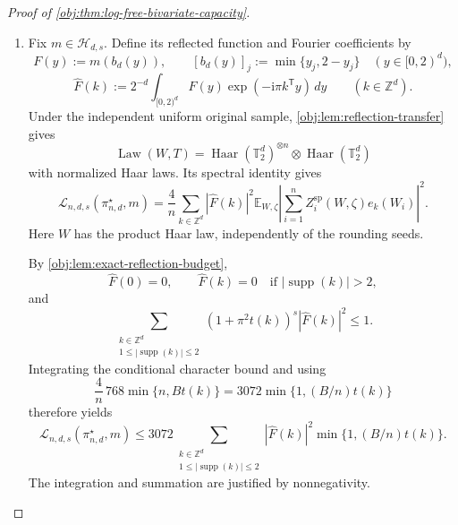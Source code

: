 \documentclass[11pt]{article}
\begin{document}
\begin{proof}[Proof of \cref{obj:thm:log-free-bivariate-capacity}]
\begin{enumerate}
Every support-one or support-two frequency is a listed representative or its negative: its first nonzero coordinate determines the orientation, and there are finitely many representatives below each fixed complexity. Since real signs give
\[
\sum_i Z_i^{\mathrm{sp}}(w,\zeta)e_{-k}(w_i)
=
\overline{\sum_i Z_i^{\mathrm{sp}}(w,\zeta)e_k(w_i)},
\qquad
t(-k)=t(k),
\]
we obtain, for every supported frequency and every deterministic \(w\),
\[
\mathbb E_\zeta
\left|
\sum_{i=1}^n Z_i^{\mathrm{sp}}(w,\zeta)e_k(w_i)
\right|^2
\leq768\min\{n,Bt(k)\},
\qquad
1\leq|\operatorname{supp}(k)|\leq2.
\]

\item
Fix \(m\in\mathcal H_{d,s}\). Define its reflected function and Fourier coefficients by
\[
F(y):=m(b_d(y)),
\qquad
[b_d(y)]_j:=\min\{y_j,2-y_j\}
\quad(y\in[0,2)^d),
\]
\[
\widehat F(k)
:=
2^{-d}\int_{[0,2)^d}
F(y)\exp(-\mathrm i\pi k^{\mathsf T}y)\,dy
\qquad(k\in\mathbb Z^d).
\]
Under the independent uniform original sample, \cref{obj:lem:reflection-transfer} gives
\[
\operatorname{Law}(W,T)
=
\operatorname{Haar}(\mathbb T_2^d)^{\otimes n}
\otimes\operatorname{Haar}(\mathbb T_2^d)
\]
with normalized Haar laws. Its spectral identity gives
\[
\mathcal L_{n,d,s}(\pi^\star_{n,d},m)
=
\frac4n
\sum_{k\in\mathbb Z^d}
|\widehat F(k)|^2
\mathbb E_{W,\zeta}
\left|
\sum_{i=1}^n Z_i^{\mathrm{sp}}(W,\zeta)e_k(W_i)
\right|^2.
\]
Here \(W\) has the product Haar law, independently of the rounding seeds.

By \cref{obj:lem:exact-reflection-budget},
\[
\widehat F(0)=0,
\qquad
\widehat F(k)=0
\quad\text{if }|\operatorname{supp}(k)|>2,
\]
and
\[
\sum_{\substack{k\in\mathbb Z^d\\
1\leq|\operatorname{supp}(k)|\leq2}}
(1+\pi^2t(k))^s|\widehat F(k)|^2
\leq1.
\]
Integrating the conditional character bound and using
\[
\frac4n\,768\min\{n,Bt(k)\}
=
3072\min\{1,(B/n)t(k)\}
\]
therefore yields
\[
\mathcal L_{n,d,s}(\pi^\star_{n,d},m)
\leq
3072
\sum_{\substack{k\in\mathbb Z^d\\
1\leq|\operatorname{supp}(k)|\leq2}}
|\widehat F(k)|^2\min\{1,(B/n)t(k)\}.
\]
The integration and summation are justified by nonnegativity.


\end{enumerate}
\end{proof}
\end{document}
